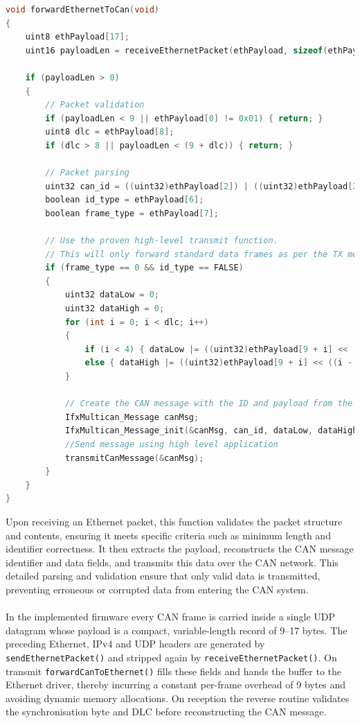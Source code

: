  
\begin{lstlisting}[language=C, caption={Ethernet to CAN message translation (Gateway.c)}, label={lst:eth_to_can}]
void forwardEthernetToCan(void)
{
    uint8 ethPayload[17];
    uint16 payloadLen = receiveEthernetPacket(ethPayload, sizeof(ethPayload));

    if (payloadLen > 0)
    {
        // Packet validation
        if (payloadLen < 9 || ethPayload[0] != 0x01) { return; }
        uint8 dlc = ethPayload[8];
        if (dlc > 8 || payloadLen < (9 + dlc)) { return; }

        // Packet parsing
        uint32 can_id = ((uint32)ethPayload[2]) | ((uint32)ethPayload[3] << 8) | ((uint32)ethPayload[4] << 16) | ((uint32)ethPayload[5] << 24);
        boolean id_type = ethPayload[6];
        boolean frame_type = ethPayload[7];

        // Use the proven high-level transmit function.
        // This will only forward standard data frames as per the TX message object's initial configuration.
        if (frame_type == 0 && id_type == FALSE)
        {
            uint32 dataLow = 0;
            uint32 dataHigh = 0;
            for (int i = 0; i < dlc; i++)
            {
                if (i < 4) { dataLow |= ((uint32)ethPayload[9 + i] << (i * 8)); }
                else { dataHigh |= ((uint32)ethPayload[9 + i] << ((i - 4) * 8)); }
            }

            // Create the CAN message with the ID and payload from the UDP packet
            IfxMultican_Message canMsg;
            IfxMultican_Message_init(&canMsg, can_id, dataLow, dataHigh, (IfxMultican_DataLengthCode)dlc);
            //Send message using high level application
            transmitCanMessage(&canMsg);
        }
    }
}
\end{lstlisting}
\newpage
\noindent
Upon receiving an Ethernet packet, this function validates the packet structure and contents, ensuring it meets specific criteria such as minimum length and identifier correctness. It then extracts the payload, reconstructs the CAN message identifier and data fields, and transmits this data over the CAN network. This detailed parsing and validation ensure that only valid data is transmitted, preventing erroneous or corrupted data from entering the CAN system.\\\\
In the implemented firmware every CAN frame is carried inside a single UDP datagram whose payload is a compact, variable-length record of 9–17 bytes. The preceding Ethernet, IPv4 and UDP headers are generated by \verb|sendEthernetPacket()| and stripped again by \verb|receiveEthernetPacket()|. On transmit \verb|forwardCanToEthernet()| fills these fields and hands the buffer to the Ethernet driver, thereby incurring a constant per-frame overhead of 9 bytes and avoiding dynamic memory allocations. On reception the reverse routine validates the synchronisation byte and DLC before reconstructing the CAN message. \\\\
